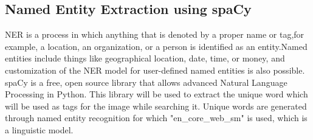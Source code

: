 \subsection{Named Entity Extraction using spaCy}
NER is a process in which anything that is denoted by a proper name or tag,for example, a location, an organization, or a person is identified as an entity.Named entities include things like geographical location, date, time, or money, and customization of the NER model for user-defined named entities is also possible\cite{shelar2020named}.\newline
spaCy is a free, open source library that allows advanced Natural Language Processing in Python. This library will be used to extract the unique word which will be used as tags for the image while searching it. Unique words are generated through named entity recognition for which "en\_core\_web\_sm" is used, which is a linguistic model.\newline

